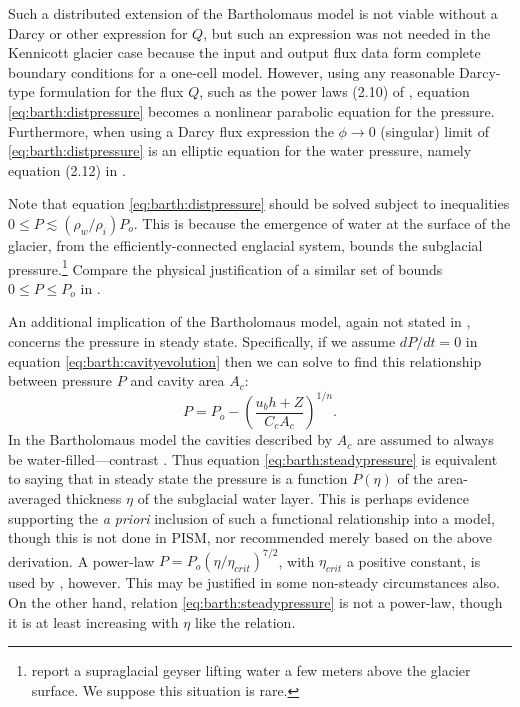 \documentclass[review,letterpaper]{igs}
\begin{document}
Such a distributed extension of the Bartholomaus model is not viable without a Darcy or other expression for $Q$, but such an expression was not needed in the Kennicott glacier case because the input and output flux data form complete boundary conditions for a one-cell model.  However, using any reasonable Darcy-type formulation for the flux $Q$, such as the power laws (2.10) of \cite{Schoofetal2012}, equation \eqref{eq:barth:distpressure} becomes a nonlinear parabolic equation for the pressure.  Furthermore, when using a Darcy flux expression the $\phi\to 0$ (singular) limit of \eqref{eq:barth:distpressure} is an elliptic equation for the water pressure, namely equation (2.12) in \cite{Schoofetal2012}.

Note that equation \eqref{eq:barth:distpressure} should be solved subject to inequalities $0 \le P \lesssim (\rho_w/\rho_i) P_o$.  This is because the emergence of water at the surface of the glacier, from the efficiently-connected englacial system, bounds the subglacial pressure.\footnote{\cite{Bartholomausetal2011} report a supraglacial geyser lifting water a few meters above the glacier surface.  We suppose this situation is rare.}  Compare the physical justification of a similar set of bounds $0 \le P \le P_o$ in \cite{Schoofetal2012}.

An additional implication of the Bartholomaus model, again not stated in \cite{Bartholomausetal2011}, concerns the pressure in steady state.  Specifically, if we assume $dP/dt=0$ in equation \eqref{eq:barth:cavityevolution} then we can solve to find this relationship between pressure $P$ and cavity area $A_c$:
\begin{equation}
P = P_o - \left(\frac{u_b h + Z}{C_c A_c}\right)^{1/n}. \label{eq:barth:steadypressure}
\end{equation}
In the Bartholomaus model the cavities described by $A_c$ are assumed to always be water-filled---contrast \citep{Schoofetal2012}.  Thus equation \eqref{eq:barth:steadypressure} is equivalent to saying that in steady state the pressure is a function $P(\eta)$ of the area-averaged thickness $\eta$ of the subglacial water layer.  This is perhaps evidence supporting the \emph{a priori} inclusion of such a functional relationship into a model, though this is not done in PISM, nor recommended merely based on the above derivation.  A power-law $P = P_o (\eta/\eta_{crit})^{7/2}$, with $\eta_{crit}$ a positive constant, is used by \cite{FlowersClarke2002_theory}, however.  This may be justified in some non-steady circumstances also.  On the other hand, relation \eqref{eq:barth:steadypressure} is not a power-law, though it is at least increasing with $\eta$ like the \cite{FlowersClarke2002_theory} relation.
\end{document}
